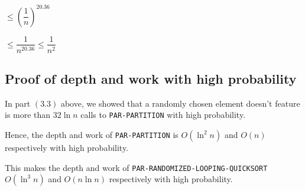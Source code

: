 \documentclass{article}
\begin{document}
$\le \left(\dfrac{1}{n}\right)^{20.36}$

$\le \dfrac{1}{n^{20.36}} \le \dfrac{1}{n^{2}}$

\subsection{Proof of depth and work with high probability}

In part $(3.3)$ above, we showed that a randomly chosen element
doesn't feature is more than $32\ln{n}$ calls to
\texttt{PAR-PARTITION} with high probability.

Hence, the depth and work of \texttt{PAR-PARTITION} is $O(\ln^2{n})$
and $O(n)$ respectively with high probability.

This makes the depth and work of
\texttt{PAR-RANDOMIZED-LOOPING-QUICKSORT} $O(\ln^3{n})$ and
$O(n\ln{n})$ respectively with high probability.
\end{document}
